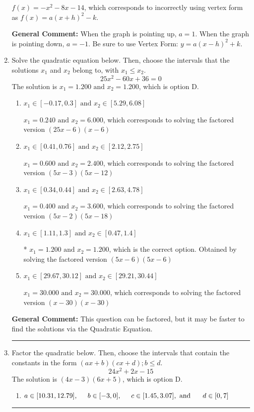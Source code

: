 \documentclass{extbook}[14pt]
\newcommand{\litem}[1]{\item #1

\rule{\textwidth}{0.4pt}}
\begin{document}
\begin{enumerate}
{\begin{enumerate}[label=\Alph*.]
$f(x)=-x^{2} -8 x -14$, which corresponds to incorrectly using vertex form as $f(x) = a(x+h)^2 - k$.
\end{enumerate}

\textbf{General Comment:} When the graph is pointing up, $a=1$. When the graph is pointing down, $a=-1$. Be sure to use Vertex Form: $y = a(x-h)^2+k$.
}
\litem{
Solve the quadratic equation below. Then, choose the intervals that the solutions $x_1$ and $x_2$ belong to, with $x_1 \leq x_2$.
\[ 25x^{2} -60 x + 36 = 0 \]The solution is \( x_1 = 1.200 \text{ and } x_2 = 1.200 \), which is option D.\begin{enumerate}[label=\Alph*.]
\item \( x_1 \in [-0.17, 0.3] \text{ and } x_2 \in [5.29, 6.08] \)

$x_1 = 0.240 \text{ and } x_2 = 6.000$, which corresponds to solving the factored version $(25x -6)(x -6)$
\item \( x_1 \in [0.41, 0.76] \text{ and } x_2 \in [2.12, 2.75] \)

$x_1 = 0.600 \text{ and } x_2 = 2.400$, which corresponds to solving the factored version $(5x -3)(5x -12)$
\item \( x_1 \in [0.34, 0.44] \text{ and } x_2 \in [2.63, 4.78] \)

$x_1 = 0.400 \text{ and } x_2 = 3.600$, which corresponds to solving the factored version $(5x -2)(5x -18)$
\item \( x_1 \in [1.11, 1.3] \text{ and } x_2 \in [0.47, 1.4] \)

* $x_1 = 1.200 \text{ and } x_2 = 1.200$, which is the correct option. Obtained by solving the factored version $(5x -6)(5x -6)$
\item \( x_1 \in [29.67, 30.12] \text{ and } x_2 \in [29.21, 30.44] \)

$x_1 = 30.000 \text{ and } x_2 = 30.000$, which corresponds to solving the factored version $(x -30)(x -30)$
\end{enumerate}

\textbf{General Comment:} This question can be factored, but it may be faster to find the solutions via the Quadratic Equation.
}
\litem{
Factor the quadratic below. Then, choose the intervals that contain the constants in the form $(ax+b)(cx+d); b \leq d.$
\[ 24x^{2} +2 x -15 \]The solution is \( (4x -3)(6x + 5) \), which is option D.\begin{enumerate}[label=\Alph*.]
\item \( a \in [10.31, 12.79], \hspace*{5mm} b \in [-3, 0], \hspace*{5mm} c \in [1.45, 3.07], \text{ and } \hspace*{5mm} d \in [0, 7] \)


\end{enumerate}}
\end{enumerate}
\end{document}

